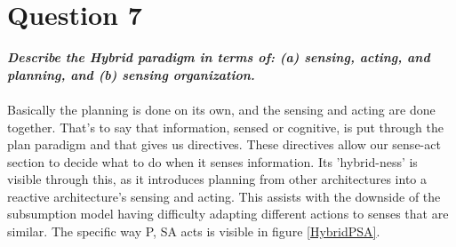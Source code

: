 \documentclass{article}
\newcommand\tab[1][1cm]{\hspace*{#1}}
\begin{document}
\section*{Question 7}
\textbf{\textit{
    \tab Describe the Hybrid paradigm in terms of: (a) sensing, acting, and planning, and (b) sensing organization.
}} \\ \\
Basically the planning is done on its own, and the sensing and acting are done together. That's to say that information,
sensed or cognitive, is put through the plan paradigm and that gives us directives. These directives allow our sense-act
section to decide what to do when it senses information. Its 'hybrid-ness' is visible through this, as it introduces
planning from other architectures into a reactive architecture's sensing and acting.
This assists with the downside of the subsumption model having difficulty adapting different actions 
to senses that are similar. The specific way P, SA acts is visible in figure \ref{HybridPSA}.
\end{document}
